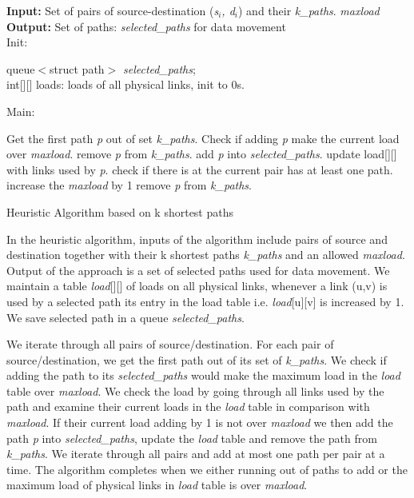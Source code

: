 \begin{algorithm}[!htbp]
\textbf{Input:} Set of pairs of source-destination (\textit{s$_i$, d$_i$}) and their \textit{k\_paths}. \textit{maxload}\\
\textbf{Output:} Set of paths: \textit{selected\_paths} for data movement\\
Init:
    \begin{algorithmic}
        \State queue$<$struct path$>$ \textit{selected\_paths};\\
	int[][] loads: loads of all physical links, init to 0s.\\
    \end{algorithmic}
Main:
\begin{algorithmic}
	    \State Get the first path \textit{p} out of set \textit{k\_paths}.
	    \State Check if adding \textit{p} make the current load over \textit{maxload}.
		\State remove \textit{p} from \textit{k\_paths}.
		\State add \textit{p} into \textit{selected\_paths}.
		\State update load[][] with links used by \textit{p}.
	    \Else 
		\State check if there is at the current pair has at least one path.
		    \State increase the \textit{maxload} by 1
		\Else
		    \State remove \textit{p} from \textit{k\_paths}.
		\EndIf
	    \EndIf
	\EndFor
	\EndWhile
    \EndFunction
\end{algorithmic}

\caption{Heuristic Algorithm based on k shortest paths}
\label{alg:heu}

\end{algorithm}

In the heuristic algorithm, inputs of the algorithm include pairs of source and destination together with their k shortest paths \textit{k\_paths} and an allowed \textit{maxload}. Output of the approach is a set of selected paths used for data movement. We maintain a table \textit{load}[][] of loads on all physical links, whenever a link (u,v) is used by a selected path its entry in the load table i.e. \textit{load}[u][v] is increased by 1. We save selected path in a queue \textit{selected\_paths}.

We iterate through all pairs of source/destination. For each pair of source/destination, we get the first path out of its set of \textit{k\_paths}. We check if adding the path to its \textit{selected\_paths} would make the maximum load in the \textit{load} table over \textit{maxload}. We check the load by going through all links used by the path and examine their current loads in the \textit{load} table in comparison with \textit{maxload}. If their current load adding by 1 is not over \textit{maxload} we then add the path \textit{p} into \textit{selected\_paths}, update the \textit{load} table and remove the path from \textit{k\_paths}. We iterate through all pairs and add at most one path per pair at a time. The algorithm completes when we either running out of paths to add or the maximum load of physical links in \textit{load} table is over \textit{maxload}.

